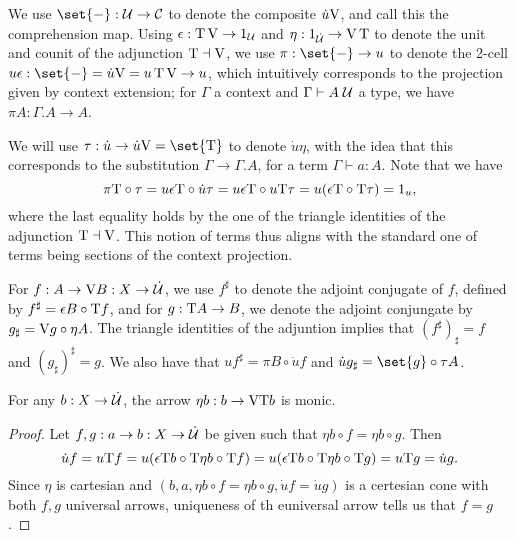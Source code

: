 \documentclass[../thesis.tex]{subfiles}
\begin{document}
\begin{notation}
  We use $\set{-} : \cU \to \cC$ to denote the composite $\dot u{{\mathrm{V}}}$, and call this the comprehension map.
  Using $\epsilon : {{\mathrm{T}}}\,{{\mathrm{V}}} \to 1_{{\mathcal{U}}}$ and $\eta : 1_{\dot{{\mathcal{U}}}} \to {{\mathrm{V}}}\,{{\mathrm{T}}}$ to denote the unit
  and counit of the adjunction ${{\mathrm{T}}} \dashv {{\mathrm{V}}}$, we use $\pi : \set{-} \to u$ to denote the 2-cell
  $u\epsilon : \set{-} = \dot u\var = u\,\typ\,\var \to u$, which intuitively corresponds to the projection
  given by context extension; for $\Gamma$ a context and $\Gamma \vdash A\;{\mathcal{U}}$ a type, we have $\pi A :
  \Gamma.A \to A$.

  We will use $\tau : \dot u \to \dot u\var = \set{\typ}$ to denote $\dot u\eta$, with the idea that this
  corresponds to the substitution $\Gamma \to \Gamma.A$, for a term $\Gamma \vdash a : A$. Note that we have
  \[
    \pi{{{\mathrm{T}}}} \circ \tau = u\epsilon{{\mathrm{T}}} \circ \dot u\tau = u\epsilon{{\mathrm{T}}} \circ u{{\mathrm{T}}}\tau =
    u(\epsilon{{\mathrm{T}}} \circ {{\mathrm{T}}}\tau) = 1_u,
  \]
  where the last equality holds by the one of the triangle identities of the adjunction ${{\mathrm{T}}} \dashv {{\mathrm{V}}}$.
  This notion of terms thus aligns with the standard one of terms being sections of the context projection.

  For $f : A \to {{\mathrm{V}}} B : X \to \dot{{\mathcal{U}}}$, we use $f^\sharp$ to denote the adjoint conjugate of $f$, defined by
  $f^\sharp = \epsilon B \circ {{\mathrm{T}}} f$, and for $g : {{\mathrm{T}}} A \to B$, we denote the adjoint conjungate by
  $g_\sharp = {{\mathrm{V}}} g \circ \eta A$. The triangle identities of the adjuntion implies that $(f^\sharp)_\sharp
  = f$ and $(g_\sharp)^\sharp = g$. We also have that $u f^\sharp = \pi B \circ \dot u f$ and $\dot u g_\sharp
  = \set{g} \circ \tau A$.
\end{notation}

\begin{proposition}
  For any $b : X \to \dot{{\mathcal{U}}}$, the arrow $\eta b : b \to {{\mathrm{V}}}{{\mathrm{T}}} b$ is monic.
\end{proposition}
\begin{proof}
  Let $f,g : a \to b : X \to \dot{{\mathcal{U}}}$ be given such that $\eta b \circ f = \eta b \circ g$. Then 
  \[\dot u f = u{{\mathrm{T}}} f = u(\epsilon{{\mathrm{T}}} b \circ {{\mathrm{T}}}\eta b \circ {{\mathrm{T}}} f) = 
  u(\epsilon{{\mathrm{T}}} b \circ {{\mathrm{T}}}\eta b \circ {{\mathrm{T}}} g) = u{{\mathrm{T}}} g = \dot u g.\]
  Since $\eta$ is cartesian and $(b,a,\eta b \circ f = \eta b \circ g, \dot u f = \dot u g)$ is a certesian
  cone with both $f,g$ universal arrows, uniqueness of th euniversal arrow tells us that $f = g$.
\end{proof}
\end{document}
